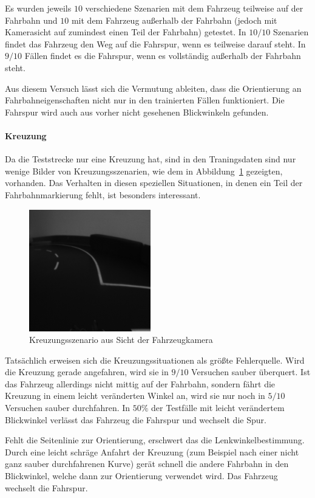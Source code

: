 Es wurden jeweils $10$ verschiedene Szenarien mit dem Fahrzeug teilweise auf der Fahrbahn und $10$ mit dem Fahrzeug außerhalb der Fahrbahn (jedoch mit Kamerasicht auf zumindest einen Teil der Fahrbahn) getestet. In $10/10$ Szenarien findet das Fahrzeug den Weg auf die Fahrspur, wenn es teilweise darauf steht. In $9/10$ Fällen findet es die Fahrspur, wenn es vollständig außerhalb der Fahrbahn steht.

Aus diesem Versuch lässt sich die Vermutung ableiten, dass die Orientierung an Fahrbahneigenschaften nicht nur in den trainierten Fällen funktioniert. Die Fahrspur wird auch aus vorher nicht gesehenen Blickwinkeln gefunden.

\paragraph{Kreuzung}
Da die Teststrecke nur eine Kreuzung hat, sind in den Traningsdaten sind nur wenige Bilder von Kreuzungsszenarien, wie dem in Abbildung~\ref{img:szenariokreuzung} gezeigten, vorhanden. Das Verhalten in diesen speziellen Situationen, in denen ein Teil der Fahrbahnmarkierung fehlt, ist besonders interessant.

\begin{figure}[h]
	\centering
	\includegraphics[scale=0.7]{figures/szenarioKreuzung.png}
	\caption{Kreuzungsszenario aus Sicht der Fahrzeugkamera}
	\label{img:szenariokreuzung}
\end{figure}

Tatsächlich erweisen sich die Kreuzungssituationen als größte Fehlerquelle. Wird die Kreuzung gerade angefahren, wird sie in $9/10$ Versuchen sauber überquert. Ist das Fahrzeug allerdings nicht mittig auf der Fahrbahn, sondern fährt die Kreuzung in einem leicht veränderten Winkel an, wird sie nur noch in $5/10$ Versuchen sauber durchfahren. In $50 \%$ der Testfälle mit leicht verändertem Blickwinkel verlässt das Fahrzeug die Fahrspur und wechselt die Spur.

Fehlt die Seitenlinie zur Orientierung, erschwert das die Lenkwinkelbestimmung. Durch eine leicht schräge Anfahrt der Kreuzung (zum Beispiel nach einer nicht ganz sauber durchfahrenen Kurve) gerät schnell die andere Fahrbahn in den Blickwinkel, welche dann zur Orientierung verwendet wird. Das Fahrzeug wechselt die Fahrspur.


